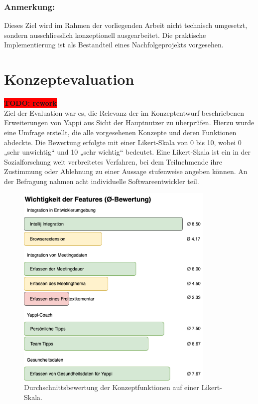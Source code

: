 \documentclass[12pt,a4paper]{report}
\newcommand{\todo}[1]{\colorbox{red}{\textbf{TODO: #1}}\\}
\begin{document}
\subsubsection{Anmerkung:}

Dieses Ziel wird im Rahmen der vorliegenden Arbeit nicht technisch umgesetzt, sondern ausschliesslich konzeptionell ausgearbeitet.
Die praktische Implementierung ist als Bestandteil eines Nachfolgeprojekts vorgesehen.

\section{Konzeptevaluation}

\todo{rework}

Ziel der Evaluation war es, die Relevanz der im Konzeptentwurf beschriebenen Erweiterungen von Yappi aus
Sicht der Hauptnutzer zu überprüfen.
Hierzu wurde eine Umfrage erstellt, die alle vorgesehenen Konzepte und deren Funktionen abdeckte.
Die Bewertung erfolgte mit einer Likert-Skala von 0 bis 10, wobei 0 „sehr unwichtig“ und 10 „sehr wichtig“ bedeutet.
Eine Likert-Skala ist ein in der Sozialforschung weit verbreitetes Verfahren, bei dem Teilnehmende ihre Zustimmung
oder Ablehnung zu einer Aussage stufenweise angeben können.
An der Befragung nahmen acht individuelle Softwareentwickler teil.

\begin{figure}[H]
  \centering
  \includegraphics[width=0.85\textwidth]{../figures/konzept-eval-feature-wichtigkeit.drawio.png}
  \caption{Durchschnittsbewertung der Konzeptfunktionen auf einer Likert-Skala.}
  \label{fig:konzept-eval-feature-wichtigkeit}
\end{figure}
\end{document}
